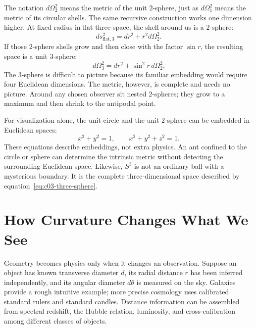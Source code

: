 The notation \(d\Omega_2^2\) means the metric of the unit \(2\)-sphere, just as \(d\Omega_1^2\) means the metric of its circular shells. The same recursive construction works one dimension higher. At fixed radius in flat three-space, the shell around us is a \(2\)-sphere:
\begin{equation}
ds_{\text{flat},3}^2 = dr^2 + r^2 d\Omega_2^2.
\label{eq:c03-flat-three-polar}
\end{equation}
If those \(2\)-sphere shells grow and then close with the factor \(\sin r\), the resulting space is a unit \(3\)-sphere:
\begin{equation}
d\Omega_3^2 = dr^2 + \sin^2 r\, d\Omega_2^2.
\label{eq:c03-three-sphere}
\end{equation}
The \(3\)-sphere is difficult to picture because its familiar embedding would require four Euclidean dimensions. The metric, however, is complete and needs no picture. Around any chosen observer sit nested \(2\)-spheres; they grow to a maximum and then shrink to the antipodal point.

\begin{classroomqa}
\end{classroomqa}

For visualization alone, the unit circle and the unit \(2\)-sphere can be embedded in Euclidean spaces:
\begin{equation}
x^2+y^2=1,
\qquad
x^2+y^2+z^2=1.
\end{equation}
These equations describe embeddings, not extra physics. An ant confined to the circle or sphere can determine the intrinsic metric without detecting the surrounding Euclidean space. Likewise, \(S^3\) is not an ordinary ball with a mysterious boundary. It is the complete three-dimensional space described by equation~\eqref{eq:c03-three-sphere}.

\section{How Curvature Changes What We See}

Geometry becomes physics only when it changes an observation. Suppose an object has known transverse diameter \(d\), its radial distance \(r\) has been inferred independently, and its angular diameter \(d\theta\) is measured on the sky. Galaxies provide a rough intuitive example; more precise cosmology uses calibrated standard rulers and standard candles. Distance information can be assembled from spectral redshift, the Hubble relation, luminosity, and cross-calibration among different classes of objects.

